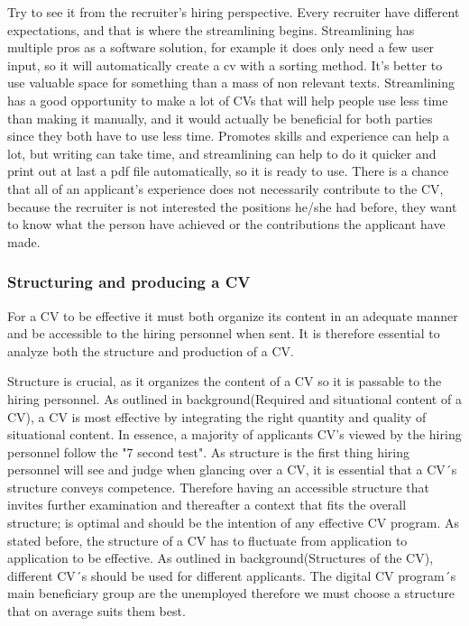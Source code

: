Try to see it from the recruiter's hiring perspective. Every recruiter have different expectations, 
and that is where the streamlining begins. Streamlining has multiple pros as a software solution,
for example it does only need a few user input, so it will automatically create a cv with a sorting method. 
It's better to use valuable space for something than a mass of non relevant texts.
Streamlining has a good opportunity to make a lot of CVs that will help people use less time than making it manually,
and it would actually be beneficial for both parties since they both have to use less time.
Promotes skills and experience can help a lot, but writing can take time, and streamlining can help to do it quicker 
and print out at last a pdf file automatically, so it is ready to use.
There is a chance that all of an applicant's experience does not necessarily contribute to the CV, 
because the recruiter is not interested the positions he/she had before, they want to know what the person have achieved
or the contributions the applicant have made. 

\subsubsection{Structuring and producing a CV}
For a CV to be effective it must both organize its content in an adequate manner and be accessible to the hiring personnel when sent.
It is therefore essential to analyze both the structure and production of a CV.

Structure is crucial, as it organizes the content of a CV so it is passable to the hiring personnel.
As outlined in background(Required and situational content of a CV), a CV is most effective by integrating the right quantity and quality of situational content.
In essence, a majority of applicants CV's viewed by the hiring personnel follow the "7 second test".
As structure is the first thing hiring personnel will see and judge when glancing over a CV, it is essential that a CV´s structure conveys competence.
Therefore having an accessible structure that invites further examination and thereafter a context that fits the overall structure;
is optimal and should be the intention of any effective CV program.
As stated before, the structure of a CV has to fluctuate from application to application to be effective.
As outlined in background(Structures of the CV), different CV´s should be used for different applicants.
The digital CV program´s main beneficiary group are the unemployed therefore we must choose a structure that on average suits them best.


